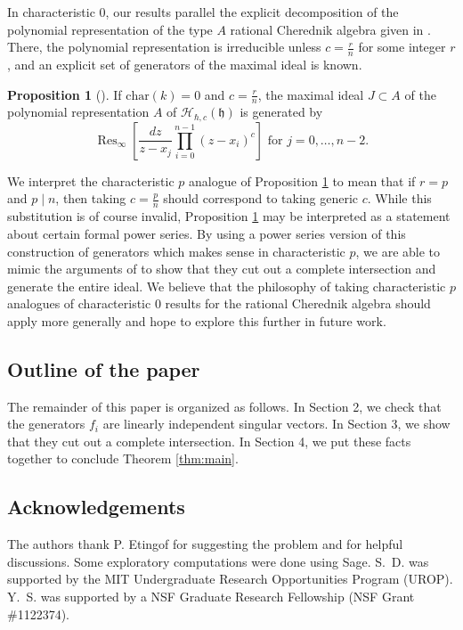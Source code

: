 \documentclass{amsart}
\numberwithin{equation}{section}
\theoremstyle{definition}
\newtheorem{proposition}[theorem]{Proposition}
\newcommand{\Res}{\operatorname{Res}}
\newcommand{\h}{\mathfrak{h}}
\newcommand{\HH}{\mathcal{H}}
\renewcommand{\char}{\text{char}}
\begin{document}
In characteristic $0$, our results parallel the explicit decomposition of the polynomial representation of the type $A$ rational Cherednik algebra given in \cite{BEG, CE}.  There, the polynomial representation is irreducible unless $c = \frac{r}{n}$ for some integer $r$, and an explicit set of generators of the maximal ideal is known.
\begin{proposition}[{\cite[Proposition 3.1]{CE}}] \label{prop:ce}
If $\char(k) = 0$ and $c = \frac{r}{n}$, the maximal ideal $J \subset A$ of the polynomial representation $A$ of $\HH_{\hbar,c}(\h)$ is generated by
\[
\Res_\infty\left[\frac{dz}{z-x_j} \prod_{i=0}^{n-1} (z-x_i)^c\right] \text{ for $j=0,\dots,n-2$}.
\]
\end{proposition}
We interpret the characteristic $p$ analogue of Proposition \ref{prop:ce} to mean that if $r = p$ and $p \mid n$, then taking $c = \frac{p}{n}$ should correspond to taking generic $c$.  While this substitution is of course invalid, Proposition \ref{prop:ce} may be interpreted as a statement about certain formal power series.  By using a power series version of this construction of generators which  makes sense in characteristic $p$, we are able to mimic the arguments of \cite{BEG, CE} to show that they cut out a complete intersection and generate the entire ideal.  We believe that the philosophy of taking characteristic $p$ analogues of characteristic $0$ results for the rational Cherednik algebra should apply more generally and hope to explore this further in future work.

\subsection{Outline of the paper}

The remainder of this paper is organized as follows.  In Section 2, we check that the generators $f_i$ are linearly independent singular vectors.  In Section 3, we show that they cut out a complete intersection.  In Section 4, we put these facts together to conclude Theorem \ref{thm:main}.

\subsection{Acknowledgements} 

The authors thank P. Etingof for suggesting the problem and for helpful discussions.  Some exploratory computations were done using Sage.  S.~D. was supported by the MIT Undergraduate Research Opportunities Program (UROP). Y.~S. was supported by a NSF Graduate Research Fellowship (NSF Grant \#1122374).
\end{document}
